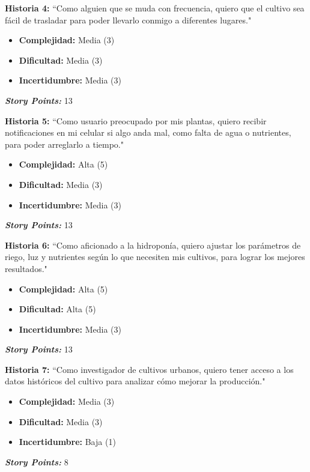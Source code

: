 \documentclass[
11pt, %
]{charter}
\begin{document}
\textbf{Historia 4:} ``Como alguien que se muda con frecuencia, quiero que el cultivo sea fácil de trasladar para poder llevarlo conmigo a diferentes lugares."

        \begin{itemize}
            \item \textbf{Complejidad:} Media (3)
            \item \textbf{Dificultad:} Media (3)
            \item \textbf{Incertidumbre:} Media (3)
        \end{itemize}
        \textit{\textbf{Story Points:}} 13

 \textbf{Historia 5:} ``Como usuario preocupado por mis plantas, quiero recibir notificaciones en mi celular si algo anda mal, como falta de agua o nutrientes, para poder arreglarlo a tiempo."

        \begin{itemize}
            \item \textbf{Complejidad:} Alta (5)
            \item \textbf{Dificultad:} Media (3)
            \item \textbf{Incertidumbre:} Media (3)
        \end{itemize}
        \textit{\textbf{Story Points:}} 13

 \textbf{Historia 6:} ``Como aficionado a la hidroponía, quiero ajustar los parámetros de riego, luz y nutrientes según lo que necesiten mis cultivos, para lograr los mejores resultados."

        \begin{itemize}
            \item \textbf{Complejidad:} Alta (5)
            \item \textbf{Dificultad:} Alta (5)
            \item \textbf{Incertidumbre:} Media (3)
        \end{itemize}
       \textit{\textbf{Story Points:}} 13

 \textbf{Historia 7:} ``Como investigador de cultivos urbanos, quiero tener acceso a los datos históricos del cultivo para analizar cómo mejorar la producción."

        \begin{itemize}
            \item \textbf{Complejidad:} Media (3)
            \item \textbf{Dificultad:} Media (3)
            \item \textbf{Incertidumbre:} Baja (1)
        \end{itemize}
        \textit{\textbf{Story Points:}} 8
  
\end{document}
